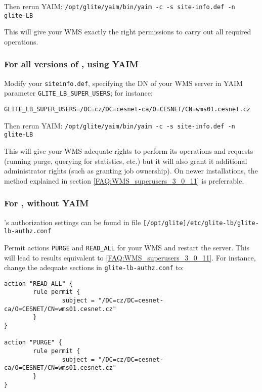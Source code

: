 Then rerun YAIM: 
\texttt{/opt/glite/yaim/bin/yaim -c -s site-info.def -n glite-LB}

 This will give your WMS exactly the right permissions to carry out all required operations.

\subsubsection{For all versions of \LB, using YAIM}

Modify your \texttt{siteinfo.def}, specifying the DN of your WMS server in YAIM parameter \texttt{GLITE\_LB\_SUPER\_USERS}; for instance:

\begin{center}
\texttt{GLITE\_LB\_SUPER\_USERS=/DC=cz/DC=cesnet-ca/O=CESNET/CN=wms01.cesnet.cz}
\end{center}

Then rerun YAIM: 
\texttt{/opt/glite/yaim/bin/yaim -c -s site-info.def -n glite-LB}

This will give your WMS adequate rights to perform its operations and requests (running purge, querying for statistics, etc.) but it will also grant it additional administrator rights (such as granting job ownership). On newer installations, the method explained in section \ref{FAQ:WMS_superusers_3_0_11} is preferrable.

\subsubsection{For , without YAIM}

\LB{}'s authorization settings can be found in file \texttt{[/opt/glite]/etc/glite-lb/glite-lb-authz.conf}

Permit actions \texttt{PURGE} and \texttt{READ\_ALL} for your WMS and restart the \LB server.
This will lead to results equivalent to \ref{FAQ:WMS_superusers_3_0_11}.
For instance, change the adequate sections in \texttt{glite-lb-authz.conf} to:

\begin{verbatim}
action "READ_ALL" {
        rule permit {
                subject = "/DC=cz/DC=cesnet-ca/O=CESNET/CN=wms01.cesnet.cz"
        }
}

action "PURGE" {
        rule permit {
                subject = "/DC=cz/DC=cesnet-ca/O=CESNET/CN=wms01.cesnet.cz"
        }
}
\end{verbatim}

